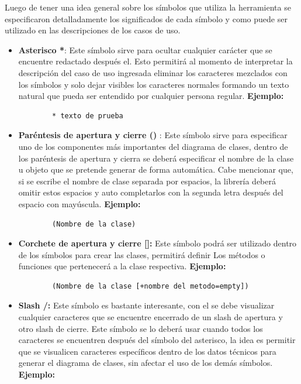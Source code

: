 Luego de tener una idea general sobre los símbolos que utiliza la herramienta se especificaron detalladamente los significados de cada símbolo y como puede ser utilizado en las descripciones de los casos de uso.  

\begin{itemize}
	\item \textbf{Asterisco *}: Este símbolo sirve para ocultar cualquier carácter que se encuentre redactado después el. Esto permitirá al momento de interpretar la descripción del caso de uso ingresada eliminar los caracteres mezclados con los símbolos y solo dejar visibles los caracteres normales formando un texto natural que pueda ser entendido por cualquier persona regular. \textbf{Ejemplo:}
	
	\begin{verbatim}
		* texto de prueba
	\end{verbatim}
	
	\item \textbf{Paréntesis de apertura y cierre ()} : Este símbolo sirve para especificar uno de los componentes más importantes del diagrama de clases, dentro de los paréntesis de apertura y cierra se deberá especificar el nombre de la clase u objeto que se pretende generar de forma automática. Cabe mencionar que, si se escribe el nombre de clase separada por espacios, la librería deberá omitir estos espacios y auto completarlos con la segunda letra después del espacio con mayúscula. \textbf{Ejemplo:}  
	
	\begin{verbatim}
		(Nombre de la clase)
	\end{verbatim}
	
	\item \textbf{Corchete de apertura y cierre []:} Este símbolo podrá ser utilizado dentro de los símbolos para crear las clases, permitirá definir Los métodos o funciones que pertenecerá a la clase respectiva. \textbf{Ejemplo:} 
	
	\begin{verbatim}
		(Nombre de la clase [+nombre del metodo=empty])
	\end{verbatim} 
	
	\item \textbf{Slash /:} Este símbolo es bastante interesante, con el se debe visualizar cualquier caracteres que se encuentre encerrado de un slash de apertura y otro slash de cierre. Este símbolo se lo deberá usar cuando todos los caracteres se encuentren después del símbolo del asterisco, la idea es permitir que se visualicen caracteres específicos dentro de los datos técnicos para generar el diagrama de clases, sin afectar el uso de los demás símbolos. \textbf{Ejemplo:}
	

\end{itemize}

